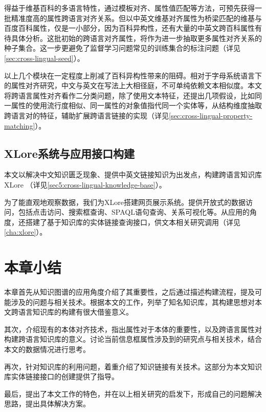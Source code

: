 得益于维基百科的多语言特性，通过模板对齐、属性值匹配等方法，可预先获得一批精准度高的属性跨语言对齐关系。但以中英文维基对齐属性为桥梁匹配的维基与百度百科属性，仅是一小部分，因为百科异构性，还有大量的中英文跨百科属性有待具体分析。这批初始的跨语言对齐属性，将作为进一步抽取更多属性对齐关系的种子集合。这一步更避免了监督学习问题常见的训练集合的标注问题（详见\ref{sec:cross-lingual-seed}）。

以上几个模块在一定程度上削减了百科异构性带来的阻碍。相对于字母系统语言下的属性对齐研究，中文与英文在写法上大相径庭，不可单纯依赖文本相似度。本文将跨语言属性对齐看作二分类问题，除了使用文本特征，还提出几项假设，比如同一属性的使用流行度相似、同一属性的对象值指代同一个实体等，从结构维度抽取跨语言对的特征，辅助扩展跨语言链接的实现（详见\ref{sec:cross-lingual-property-matching}）。

\subsection{XLore系统与应用接口构建}
本文以解决中文知识匮乏现象、提供中英文链接知识为出发点，构建跨语言知识库XLore
（详见\ref{sec5:cross-lingual-knowledge-base}）。

为了能直观地观察数据，我们为XLore搭建网页展示系统。提供开放式的数据访问，包括点击访问、搜索框查询、SPAQL语句查询、关系可视化等。从应用的角度，还搭建了基于知识库的实体链接查询接口，供文本相关研究调用（详见\ref{cha:xlore}）。

\section{本章小结}
本章首先从知识图谱的应用角度介绍了其重要性，之后通过描述构建流程，提及可能涉及的问题与相关技术。根据本文的工作，列举了知名知识库，其构建思想对本文跨语言知识库的构建有很大借鉴意义。

其次，介绍现有的本体对齐技术，指出属性对于本体的重要性，以及跨语言属性对构建跨语言知识库的意义。讨论当前信息框属性涉及到的研究点与相关技术，结合本文的数据情况进行思考。

再次，针对知识库的利用问题，着重介绍了知识链接有关技术。这部分为本文知识库实体链接接口的创建提供了指导。

最后，提出了本文工作的特色，并在以上相关研究的启发下，形成自己的问题解决思路，提出具体解决方案。

